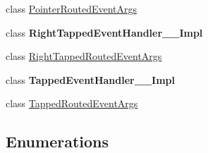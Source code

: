 \begin{DoxyCompactItemize}
\item 
class \hyperlink{class_windows_1_1_u_i_1_1_xaml_1_1_input_1_1_pointer_routed_event_args}{Pointer\+Routed\+Event\+Args}
\item 
class {\bfseries Right\+Tapped\+Event\+Handler\+\_\+\+\_\+\+Impl}
\item 
class \hyperlink{class_windows_1_1_u_i_1_1_xaml_1_1_input_1_1_right_tapped_routed_event_args}{Right\+Tapped\+Routed\+Event\+Args}
\item 
class {\bfseries Tapped\+Event\+Handler\+\_\+\+\_\+\+Impl}
\item 
class \hyperlink{class_windows_1_1_u_i_1_1_xaml_1_1_input_1_1_tapped_routed_event_args}{Tapped\+Routed\+Event\+Args}
\end{DoxyCompactItemize}
\subsection*{Enumerations}
